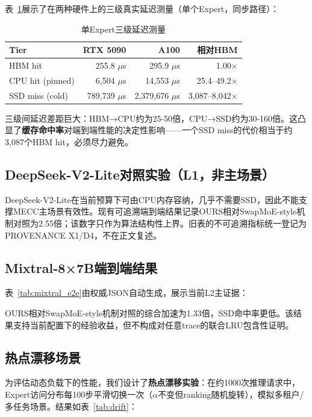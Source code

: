 \documentclass[11pt,a4paper]{article}
\begin{document}
表~\ref{tab:latency}展示了在两种硬件上的三级真实延迟测量（单个Expert，同步路径）：

\begin{table}[!h]
\centering
\caption{单Expert三级延迟测量}
\label{tab:latency}
\begin{tabular}{lrrr}
\toprule
\textbf{Tier} & \textbf{RTX 5090} & \textbf{A100} & \textbf{相对HBM} \\
\midrule
HBM hit & 255.8 $\mu$s & 295.9 $\mu$s & 1.00× \\
CPU hit (pinned) & 6,504 $\mu$s & 14,553 $\mu$s & 25.4--49.2× \\
SSD miss (cold) & 789,739 $\mu$s & 2,379,676 $\mu$s & 3,087--8,042× \\
\bottomrule
\end{tabular}
\end{table}

三级间延迟差距巨大：HBM→CPU约为25-50倍，CPU→SSD约为30-160倍。这凸显了\textbf{缓存命中率}对端到端性能的决定性影响——一个SSD miss的代价相当于约3,087个HBM hit，必须尽力避免。

\subsection{DeepSeek-V2-Lite对照实验（L1，非主场景）}

DeepSeek-V2-Lite在当前预算下可由CPU内存容纳，几乎不需要SSD，因此不能支撑MECC主场景有效性。现有可追溯端到端结果记录OURS相对SwapMoE-style机制对照为2.55倍；该数字只作为算法结构性上界。旧表的不可追溯指标统一登记为PROVENANCE X1/D4，不在正文复述。

\subsection{Mixtral-8×7B端到端结果}

表~\ref{tab:mixtral_e2e}由权威JSON自动生成，展示当前L2主证据：



OURS相对SwapMoE-style机制对照的综合加速为1.33倍，SSD命中率更低。该结果支持当前配置下的经验收益，但不构成对任意trace的联合LRU包含性证明。

\subsection{热点漂移场景}

为评估动态负载下的性能，我们设计了\textbf{热点漂移实验}：在约1000次推理请求中，Expert访问分布每100步平滑切换一次（$\alpha$不变但ranking随机旋转），模拟多租户/多任务场景。结果如表~\ref{tab:drift}：
\end{document}
